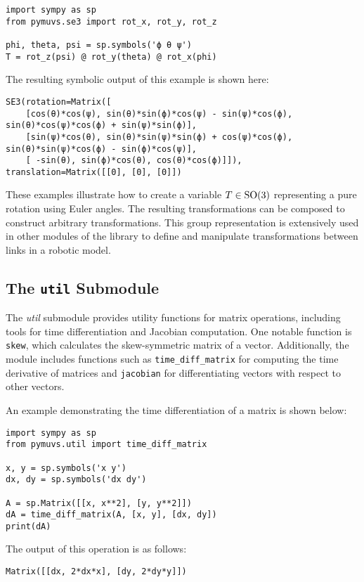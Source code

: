 \begin{lstlisting}[style=custompython,
    caption={Creating a rotation matrix from Euler angles.},
    label={lst:usage:se30}]
import sympy as sp
from pymuvs.se3 import rot_x, rot_y, rot_z

phi, theta, psi = sp.symbols('ϕ θ ψ')
T = rot_z(psi) @ rot_y(theta) @ rot_x(phi)
\end{lstlisting}

The resulting symbolic output of this example is shown here:

\begin{lstlisting}[style=customtxt,
    caption={Output of \autoref{lst:codegen}.},
    label={lst:usage:se3}]
SE3(rotation=Matrix([
    [cos(θ)*cos(ψ), sin(θ)*sin(ϕ)*cos(ψ) - sin(ψ)*cos(ϕ), sin(θ)*cos(ψ)*cos(ϕ) + sin(ψ)*sin(ϕ)],
    [sin(ψ)*cos(θ), sin(θ)*sin(ψ)*sin(ϕ) + cos(ψ)*cos(ϕ), sin(θ)*sin(ψ)*cos(ϕ) - sin(ϕ)*cos(ψ)],
    [ -sin(θ), sin(ϕ)*cos(θ), cos(θ)*cos(ϕ)]]),
translation=Matrix([[0], [0], [0]])
\end{lstlisting}

These examples illustrate how to create a variable $T \in \operatorname{SO}(3)$ representing a pure rotation using Euler angles. The resulting transformations can be composed to construct arbitrary transformations. This group representation is extensively used in other modules of the library to define and manipulate transformations between links in a robotic model.



\subsection{The \texttt{util} Submodule}

The \emph{util} submodule provides utility functions for matrix operations, including tools for time differentiation and Jacobian computation. One notable function is \texttt{skew}, which calculates the skew-symmetric matrix of a vector. Additionally, the module includes functions such as \texttt{time\_diff\_matrix} for computing the time derivative of matrices and \texttt{jacobian} for differentiating vectors with respect to other vectors.

An example demonstrating the time differentiation of a matrix is shown below:

\begin{lstlisting}[style=custompython,
    caption={Time differentiation of a matrix.},
    label={lst:usage:util:time_diff_matrix}]
import sympy as sp
from pymuvs.util import time_diff_matrix

x, y = sp.symbols('x y')
dx, dy = sp.symbols('dx dy')

A = sp.Matrix([[x, x**2], [y, y**2]])
dA = time_diff_matrix(A, [x, y], [dx, dy])
print(dA)
\end{lstlisting}
The output of this operation is as follows:
\begin{lstlisting}[style=customtxt,
    caption={Output of \autoref{lst:usage:util:time_diff_matrix}.},
    label={lst:usage:util:time_diff_matrix:out}]
Matrix([[dx, 2*dx*x], [dy, 2*dy*y]])
\end{lstlisting}

